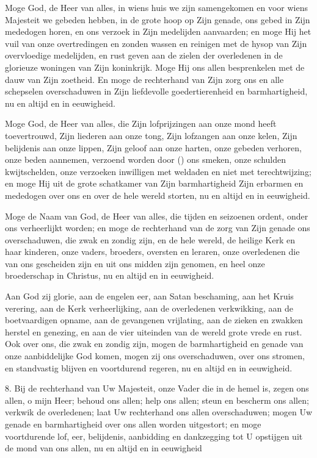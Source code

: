 \documentclass[12pt,twoside,a5paper]{article}
\begin{document}
\begin{halfparskip}
   Moge God, de Heer van alles, in wiens huis we zijn samengekomen en voor wiens Majesteit we gebeden hebben, in de grote hoop op Zijn genade, ons gebed in Zijn mededogen horen, en ons verzoek in Zijn medelijden aanvaarden; en moge Hij het vuil van onze overtredingen en zonden wassen en reinigen met de hysop van Zijn overvloedige medelijden, en rust geven aan de zielen der overledenen in de glorieuze woningen van Zijn koninkrijk. Moge Hij ons allen besprenkelen met de dauw van Zijn zoetheid. En moge de rechterhand van Zijn zorg ons en alle schepselen overschaduwen in Zijn liefdevolle goedertierenheid en barmhartigheid, nu en altijd en in eeuwigheid.

   Moge God, de Heer van alles, die Zijn lofprijzingen aan onze mond heeft toevertrouwd, Zijn liederen aan onze tong, Zijn lofzangen aan onze kelen, Zijn belijdenis aan onze lippen, Zijn geloof aan onze harten, onze gebeden verhoren, onze beden aannemen, verzoend worden door () ons smeken, onze schulden kwijtschelden, onze verzoeken inwilligen met weldaden en niet met terechtwijzing; en moge Hij uit de grote schatkamer van Zijn barmhartigheid Zijn erbarmen en mededogen over ons en over de hele wereld storten, nu en altijd en in eeuwigheid.

   Moge de Naam van God, de Heer van alles, die tijden en seizoenen ordent, onder ons verheerlijkt worden; en moge de rechterhand van de zorg van Zijn genade ons overschaduwen, die zwak en zondig zijn, en de hele wereld, de heilige Kerk en haar kinderen, onze vaders, broeders, oversten en leraren, onze overledenen die van ons gescheiden zijn en uit ons midden zijn genomen, en heel onze broederschap in Christus, nu en altijd en in eeuwigheid.

   Aan God zij glorie, aan de engelen eer, aan Satan beschaming, aan het Kruis verering, aan de Kerk verheerlijking, aan de overledenen verkwikking, aan de boetvaardigen opname, aan de gevangenen vrijlating, aan de zieken en zwakken herstel en genezing, en aan de vier uiteinden van de wereld grote vrede en rust. Ook over ons, die zwak en zondig zijn, mogen de barmhartigheid en genade van onze aanbiddelijke God komen, mogen zij ons overschaduwen, over ons stromen, en standvastig blijven en voortdurend regeren, nu en altijd en in eeuwigheid.

  8. Bij de rechterhand van Uw Majesteit, onze Vader die in de hemel is, zegen ons allen, o mijn Heer; behoud ons allen; help ons allen; steun en bescherm ons allen; verkwik de overledenen; laat Uw rechterhand ons allen overschaduwen; mogen Uw genade en barmhartigheid over ons allen worden uitgestort; en moge voortdurende lof, eer, belijdenis, aanbidding en dankzegging tot U opstijgen uit de mond van ons allen, nu en altijd en in eeuwigheid


\end{halfparskip}
\end{document}
